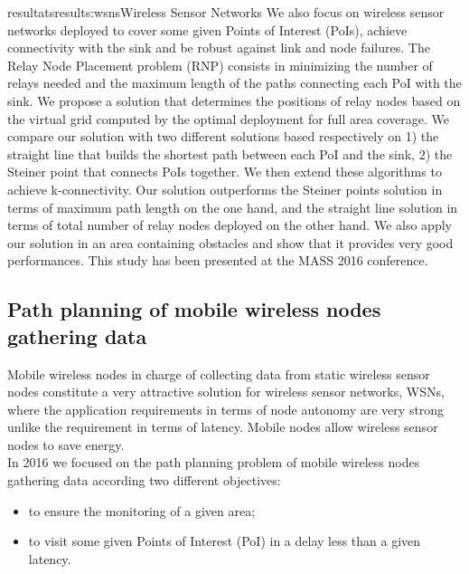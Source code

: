\documentclass{ra2016}
\begin{document}
\begin{module}{resultats}{results:wsns}{Wireless Sensor Networks}
We also focus on wireless sensor networks deployed to cover some given Points of Interest (PoIs), achieve connectivity with the sink and be robust against link and node failures. 
The Relay Node Placement problem (RNP) consists in minimizing the number of relays needed and the maximum length of the paths connecting each PoI with the sink. 
We propose a solution that determines the positions of relay nodes based on the virtual grid computed by the optimal deployment for full area coverage.  We compare our solution with two different solutions based respectively on 1) the straight line that builds the shortest path between each PoI and the sink, 2) the Steiner point that connects PoIs together. We then extend these algorithms to achieve k-connectivity. Our solution outperforms the Steiner points solution in terms of maximum path length on the one hand, and the straight line solution in terms of total number of relay nodes deployed on the other hand. We also apply our solution in an area containing obstacles and show that it provides very good performances. This study has been presented at the MASS 2016 conference.\\

\subsection{Path planning of mobile wireless nodes gathering data}

Mobile wireless nodes in charge of collecting data from static wireless sensor nodes constitute a very attractive solution for wireless sensor networks, WSNs, where the application requirements in terms of node autonomy are very strong unlike the requirement in terms of latency. Mobile nodes allow wireless sensor nodes to save energy.\\

In 2016 we focused on the path planning problem of mobile wireless nodes gathering data according two different objectives:
\begin{itemize}
\item to ensure the monitoring of a given area;
\item to visit some given Points of Interest (PoI) in a delay less than a given latency.\\
\end{itemize}


\end{module}
\end{document}
